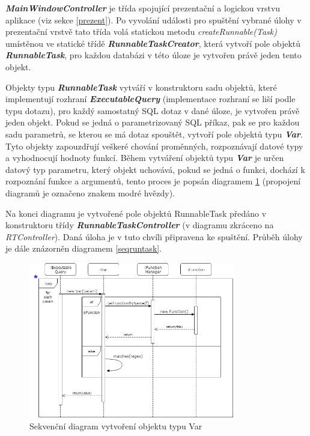 \documentclass[czech,bachelor,public,dept460,male,cpdeclaration,twoside]{diploma}
\begin{document}
\textbf{\emph{MainWindowController}} je třída spojující prezentační a logickou vrstvu aplikace (viz sekce \ref{prezent}). Po vyvolání události pro spuštění vybrané úlohy v prezentační vrstvě tato třída volá statickou metodu \textit{createRunnable(Task)} umístěnou ve statické třídě \textbf{\emph{RunnableTaskCreator}}, která vytvoří pole objektů \textbf{\emph{RunnableTask}}, pro každou databázi v této úloze je vytvořen právě jeden tento objekt.

Objekty typu \textbf{\emph{RunnableTask}} vytváří v konstruktoru sadu objektů, které implementují rozhraní \textbf{\emph{ExecutableQuery}} (implementace rozhraní se liší podle typu dotazu), pro každý samostatný SQL dotaz v dané úloze, je vytvořen právě jeden objekt. Pokud se jedná o parametrizovaný SQL příkaz, pak se pro každou sadu parametrů, se kterou se má dotaz spouštět, vytvoří pole objektů typu \textbf{\emph{Var}}. Tyto objekty zapouzdřují veškeré chování proměnných, rozpoznávají datové typy a vyhodnocují hodnoty funkcí. Během vytváření objektů typu \textbf{\emph{Var}} je určen datový typ parametru, který objekt uchovává, pokud se jedná o funkci, dochází k rozpoznání funkce a argumentů, tento proces je popsán diagramem \ref{seqvar} (propojení diagramů je označeno znakem modré hvězdy).


Na konci diagramu je vytvořené pole objektů RunnableTask předáno v konstruktoru třídy  \textbf{\emph{RunnableTaskController}} (v diagramu zkráceno na \textit{RTController}). Daná úloha je v tuto chvíli připravena ke spuštění. Průběh úlohy je dále znázorněn diagramem \ref{seqruntask}.


\begin{figure}[!htbp]\centering\includegraphics[width=0.8\textwidth]{Figures/var.png}\caption{Sekvenční diagram vytvoření objektu typu Var}
\label{seqvar}
\end{figure}
\end{document}
